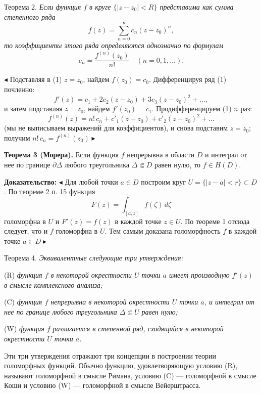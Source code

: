 \documentclass[12pt, a4paper]{article}
\theoremstyle{definition}
\theoremstyle{remark}
\begin{document}
Теорема 2. \textit{Если функция $f$ в круге $\{|z - z_0| < R\}$ представима как сумма степенного ряда}
\begin{equation}
	f(z) = \sum_{n=0}^{\infty} c_n (z - z_0)^n,
	\tag{1}
\end{equation}
\textit{то коэффициенты этого ряда определяются однозначно по формулам}
\begin{equation}
	c_n = \frac{f^{(n)}(z_0)}{n!} \quad (n = 0, 1, \dots).
	\tag{2}
\end{equation}

$\blacktriangleleft$ Подставляя в (1) $z = z_0$, найдем $f(z_0) = c_0$. Дифференцируя ряд (1) почленно:
$$
f'(z) = c_1 + 2c_2(z - z_0) + 3c_3(z - z_0)^2 + \dots,
$$
и затем подставляя $z = z_0$, найдем $f'(z_0) = c_1$. Продифференцируем (1) $n$ раз:
$$
f^{(n)}(z) = n! \, c_n + c'_1 (z - z_0) + c'_2 (z - z_0)^2 + \dots
$$
(мы не выписываем выражений для коэффициентов), и снова подставим $z = z_0$; получим $n! \, c_n = f^{(n)}(z_0) \blacktriangleright$

\textbf{Теорема 3 (Морера).} Если функция $f$ непрерывна в области $D$ и интеграл от нее по границе $\partial \Delta$ любого треугольника $\Delta \Subset D$ равен нулю, то $f \in H(D)$.

\textbf{Доказательство:}
$\blacktriangleleft$ Для любой точки $a \in D$ построим круг $U = \{|z - a| < r\} \subset D$. По теореме 2 п. 15 функция
$$
F(z) = \int_{[a, z]} f(\zeta) \, d\zeta
$$
голоморфна в $U$ и $F'(z) = f(z)$ в каждой точке $z \in U$. По теореме 1 отсюда следует, что и $f$ голоморфна в $U$. Тем самым доказана голоморфность $f$ в каждой точке $a \in D \blacktriangleright$

Теорема 4. \textit{Эквивалентные следующие три утверждения:}

(R) \textit{функция $f$ в некоторой окрестности $U$ точки $a$ имеет производную $f'(z)$ в смысле комплексного анализа;}

(C) \textit{функция $f$ непрерывна в некоторой окрестности $U$ точки $a$, и интеграл от нее по границе любого треугольника $\Delta \Subset U$ равен нулю;}

(W) \textit{функция $f$ разлагается в степенной ряд, сходящийся в некоторой окрестности $U$ точки $a$.}

Эти три утверждения отражают три концепции в построении теории голоморфных функций. Обычно функцию, удовлетворяющую условию (R), называют голоморфной в смысле Римана, условию (C) — голоморфной в смысле Коши и условию (W) — голоморфной в смысле Вейерштрасса.
\end{document}
